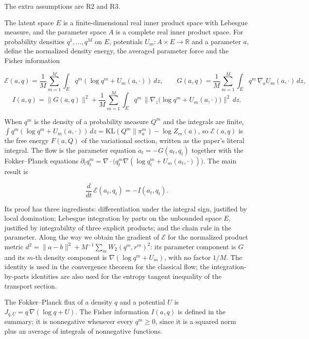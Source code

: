 \documentclass[11pt,a4paper]{report}
\begin{document}
The extra assumptions are R2 and R3.




The latent space \(E\) is a finite-dimensional real inner product space with Lebesgue measure, and the parameter space \(A\) is a complete real inner product space. For probability densities \(q^1,\dots,q^M\) on \(E\), potentials \(U_m:A\times E\to\mathbb R\) and a parameter \(a\), define the normalized density energy, the averaged parameter force and the Fisher information


\[\mathcal E(a,q)=\frac1M\sum_{m=1}^M\int_Eq^m(\log q^m+U_m(a,\cdot))\,dz,\qquad G(a,q)=\frac1M\sum_{m=1}^M\int_Eq^m\,\nabla_aU_m(a,\cdot)\,dz,\]
\[I(a,q)=\|G(a,q)\|^2+\frac1M\sum_{m=1}^M\int_Eq^m\,\bigl\|\nabla_z\bigl(\log q^m+U_m(a,\cdot)\bigr)\bigr\|^2\,dz.\]


When \(q^m\) is the density of a probability measure \(Q^m\) and the integrals are finite, \(\int q^m(\log q^m+U_m(a,\cdot))\,dz=\mathrm{KL}(Q^m\|\pi_a^m)-\log Z_m(a)\), so \(\mathcal E(a,q)\) is the free energy \(F(a,Q)\) of the variational section, written as the paper's literal integral. The flow is the parameter equation \(\dot a_t=-G(a_t,q_t)\) together with the Fokker–Planck equations \(\partial_tq_t^m=\nabla\cdot\bigl(q_t^m\nabla(\log q_t^m+U_m(a_t,\cdot))\bigr)\). The main result is


\[\frac{d}{dt}\,\mathcal E(a_t,q_t)=-I(a_t,q_t).\]


Its proof has three ingredients: differentiation under the integral sign, justified by local domination; Lebesgue integration by parts on the unbounded space \(E\), justified by integrability of three explicit products; and the chain rule in the parameter. Along the way we obtain the gradient of \(\mathcal E\) for the normalized product metric \(d^2=\|a-b\|^2+M^{-1}\sum_mW_2(q^m,r^m)^2\): its parameter component is \(G\) and its \(m\)-th density component is \(\nabla(\log q^m+U_m)\), with no factor \(1/M\). The identity is used in the convergence theorem for the classical flow; the integration-by-parts identities are also used for the entropy tangent inequality of the transport section.



The Fokker–Planck flux of a density \(q\) and a potential \(U\) is \(J_{q,U}=q\,\nabla(\log q+U)\). The Fisher information \(I(a,q)\) is defined in the summary; it is nonnegative whenever every \(q^m\ge0\), since it is a squared norm plus an average of integrals of nonnegative functions.
\end{document}
